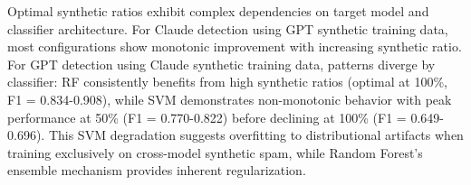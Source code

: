 Optimal synthetic ratios exhibit complex dependencies on target model and classifier architecture. For Claude detection using GPT synthetic training data, most configurations show monotonic improvement with increasing synthetic ratio. For GPT detection using Claude synthetic training data, patterns diverge by classifier: RF consistently benefits from high synthetic ratios (optimal at 100\%, F1 = 0.834-0.908), while SVM demonstrates non-monotonic behavior with peak performance at 50\% (F1 = 0.770-0.822) before declining at 100\% (F1 = 0.649-0.696). This SVM degradation suggests overfitting to distributional artifacts when training exclusively on cross-model synthetic spam, while Random Forest's ensemble mechanism provides inherent regularization.